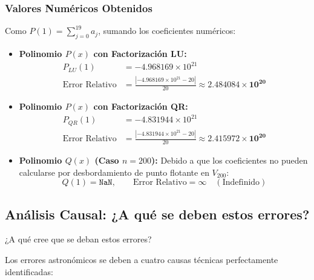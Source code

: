 \documentclass[11pt,a4paper]{article}
\theoremstyle{definition}
\theoremstyle{remark}
\begin{document}
\subsubsection{Valores Numéricos Obtenidos}
Como $P(1) = \sum_{j=0}^{19} a_j$, sumando los coeficientes numéricos:
\begin{itemize}[leftmargin=*]
    \item \textbf{Polinomio $P(x)$ con Factorización LU:}
    \begin{align}
        P_{LU}(1) &= -4.968169 \times 10^{21} \\
        \text{Error Relativo} &= \frac{|-4.968169 \times 10^{21} - 20|}{20} \approx \mathbf{2.484084 \times 10^{20}}
    \end{align}
    \item \textbf{Polinomio $P(x)$ con Factorización QR:}
    \begin{align}
        P_{QR}(1) &= -4.831944 \times 10^{21} \\
        \text{Error Relativo} &= \frac{|-4.831944 \times 10^{21} - 20|}{20} \approx \mathbf{2.415972 \times 10^{20}}
    \end{align}
    \item \textbf{Polinomio $Q(x)$ (Caso $n = 200$):}
    Debido a que los coeficientes no pueden calcularse por desbordamiento de punto flotante en $V_{200}$:
    \begin{equation}
        Q(1) = \texttt{NaN}, \qquad \text{Error Relativo} = \bm{\infty} \quad (\text{Indefinido})
    \end{equation}
\end{itemize}

\subsection{Análisis Causal: ¿A qué se deben estos errores?}

\begin{solbox}
¿A qué cree que se deban estos errores?
\end{solbox}

Los errores astronómicos se deben a cuatro causas técnicas perfectamente identificadas:
\end{document}
